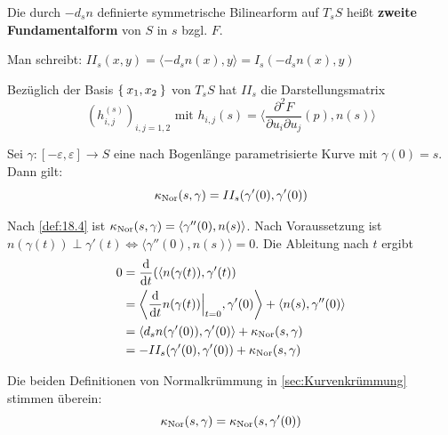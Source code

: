 \begin{definition}%
    Die durch $-d_s n$ definierte symmetrische Bilinearform auf $T_s S$ heißt
    \textbf{zweite Fundamentalform} von $S$ in $s$ bzgl. $F$.

    Man schreibt: $II_s(x,y) =  \langle - d_s n(x), y \rangle = I_s (-d_s n(x), y)$
\end{definition}

\begin{bemerkung}%
    Bezüglich der Basis $\Set{x_1, x_2}$ von $T_s S$ hat $II_s$ die Darstellungsmatrix
    \[(h^{(s)}_{i,j})_{i,j=1,2} \text{ mit } h_{i,j}(s) = \langle \frac{\partial^2 F}{\partial u_i \partial u_j} (p), n(s) \rangle \]
\end{bemerkung}

\begin{proposition}\label{prop:19.6}%
    Sei $\gamma:[- \varepsilon, \varepsilon] \rightarrow S$ eine nach Bogenlänge
    parametrisierte Kurve mit $\gamma(0) = s$. Dann gilt:
    \[\kappa_{\textnormal{Nor}}(s, \gamma) = II_s(\gamma'(0), \gamma'(0))\]
\end{proposition}

\begin{beweis}
    Nach \cref{def:18.4} ist $\kappa_{\textnormal{Nor}}(s, \gamma) = \langle \gamma''(0), n(s) \rangle$.
    Nach Voraussetzung ist $n(\gamma(t)) \perp \gamma'(t) \Leftrightarrow \langle \gamma''(0), n(s) \rangle = 0$.
    Die Ableitung nach $t$ ergibt 
    \begin{align*}
        0 &= \frac{\mathrm{d}}{\mathrm{d}t}(\langle n (\gamma(t)), \gamma'(t))\\
        &= \left \langle \frac{\mathrm{d}}{\mathrm{d}t} n(\gamma(t)) \Bigr |_{t=0}, \gamma'(0) \right \rangle + \langle n(s), \gamma''(0) \rangle\\
        &= \langle d_s n (\gamma'(0)), \gamma'(0) \rangle + \kappa_{\textnormal{Nor}}(s,\gamma)\\
        &= - II_s(\gamma'(0), \gamma'(0)) + \kappa_{\textnormal{Nor}}(s, \gamma)
    \end{align*}
\end{beweis}

\begin{folgerung}%
    Die beiden Definitionen von Normalkrümmung in \cref{sec:Kurvenkrümmung} stimmen
    überein:
    \[\kappa_{\textnormal{Nor}}(s, \gamma) = \kappa_{\textnormal{Nor}}(s, \gamma'(0))\]
\end{folgerung}


